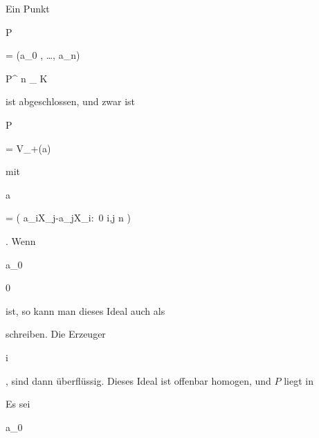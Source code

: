 {


Ein Punkt


\mavergleichskette

{\vergleichskette

{ P
}

{ = }{ (a_0 , \ldots , a_n)
}

{ \in }{ {\mathbb P}^{ n }_{ K }
}

{    }{
}

{   }{
}

}
{}{}{}
ist abgeschlossen, und zwar ist


\mavergleichskette

{\vergleichskette

{ P
}

{ = }{ V_+({\mathfrak a})
}

{  }{
}

{    }{
}

{   }{
}

}
{}{}{}
mit


\mavergleichskettedisp

{\vergleichskette

{ {\mathfrak a}
}

{ =} { \left(  a_iX_j-a_jX_i:\, 0 \leq i,j \leq n  \right)
}

{ } {
}

{ } {
}

{ } {
}

}
{}{}{.}
Wenn


\mavergleichskette

{\vergleichskette

{ a_0
}

{ \neq }{ 0
}

{  }{
}

{    }{
}

{   }{
}

}
{}{}{}
ist, so kann man dieses Ideal auch als

 schreiben. Die Erzeuger

 {}

 {i } {}

 {} {} {} {,} sind dann überflüssig. Dieses Ideal ist offenbar homogen, und $P$ liegt in

 Es sei


\mavergleichskette

{\vergleichskette

{ a_0
}

}}
